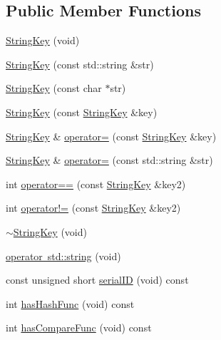 \subsection*{Public Member Functions}
\begin{DoxyCompactItemize}
\item 
\mbox{\hyperlink{classFILEDB_1_1StringKey_ada360436c743f4464e82b0cb2757d229}{String\+Key}} (void)
\item 
\mbox{\hyperlink{classFILEDB_1_1StringKey_a18edda7351ebadd52d18bcde2cc8a71c}{String\+Key}} (const std\+::string \&str)
\item 
\mbox{\hyperlink{classFILEDB_1_1StringKey_a7710b1f6cafd04e1e178d24019e81ae5}{String\+Key}} (const char $\ast$str)
\item 
\mbox{\hyperlink{classFILEDB_1_1StringKey_a042b0231e08bfbd9f9bc3802d95d0e9c}{String\+Key}} (const \mbox{\hyperlink{classFILEDB_1_1StringKey}{String\+Key}} \&key)
\item 
\mbox{\hyperlink{classFILEDB_1_1StringKey}{String\+Key}} \& \mbox{\hyperlink{classFILEDB_1_1StringKey_a2081a1d6473a3139ecdd642dcc2874ba}{operator=}} (const \mbox{\hyperlink{classFILEDB_1_1StringKey}{String\+Key}} \&key)
\item 
\mbox{\hyperlink{classFILEDB_1_1StringKey}{String\+Key}} \& \mbox{\hyperlink{classFILEDB_1_1StringKey_a0d36351143904ce0b1b6716e4f95d8b5}{operator=}} (const std\+::string \&str)
\item 
int \mbox{\hyperlink{classFILEDB_1_1StringKey_a75f2abcdf7d61bb860156f8758a56a1f}{operator==}} (const \mbox{\hyperlink{classFILEDB_1_1StringKey}{String\+Key}} \&key2)
\item 
int \mbox{\hyperlink{classFILEDB_1_1StringKey_ad7c210e36fa7438742afa4ed3c66a3df}{operator!=}} (const \mbox{\hyperlink{classFILEDB_1_1StringKey}{String\+Key}} \&key2)
\item 
\mbox{\hyperlink{classFILEDB_1_1StringKey_a45b2488c42cb895e30b927366ae96785}{$\sim$\+String\+Key}} (void)
\item 
\mbox{\hyperlink{classFILEDB_1_1StringKey_a4ce28a2e70cc35cbf7dd8f7a9424fbb0}{operator std\+::string}} (void)
\item 
const unsigned short \mbox{\hyperlink{classFILEDB_1_1StringKey_ad139b5cab667be479edae524f436805a}{serial\+ID}} (void) const
\item 
int \mbox{\hyperlink{classFILEDB_1_1StringKey_afb2fa99d53c0f4b5aeca0377228ea722}{has\+Hash\+Func}} (void) const
\item 
int \mbox{\hyperlink{classFILEDB_1_1StringKey_a430c4d6d22db7160c501c1703f9f13cf}{has\+Compare\+Func}} (void) const

\end{DoxyCompactItemize}
